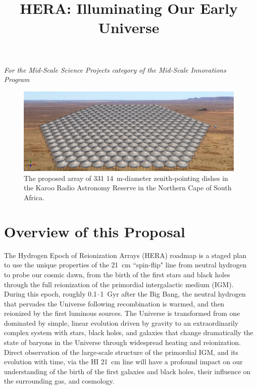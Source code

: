 \documentclass[preprint]{aastex}
\def\HI{{H{\small I }}}
\begin{document}
\title{HERA: Illuminating Our Early Universe}
{\it For the Mid-Scale Science Projects category of the Mid-Scale
Innovations Program}

\begin{figure}[H]\centering
\includegraphics[width=6in]{plots/hera331perspect2.jpg}
\caption{\small
The proposed array of 331 14~m-diameter zenith-pointing dishes in the Karoo Radio Astronomy Reserve
in the Northern Cape of South Africa.
}\label{fig:hera_array} \end{figure}


\vspace{-0.4in}
\section{Overview of this Proposal} %


The Hydrogen Epoch of Reionization Arrays (HERA) roadmap is a staged
plan to use the unique properties of the 21~cm ``spin-flip" line from neutral
hydrogen to probe our cosmic dawn, from the birth of the first 
stars and black holes through the full reionization of the primordial
intergalactic medium (IGM). During this epoch, roughly 0.1--1~Gyr after the Big Bang, 
the neutral hydrogen that pervades the Universe 
following recombination is warmed, and then reionized by the first luminous sources. 
The Universe is transformed from one dominated by simple,
linear evolution driven by gravity to an extraordinarily complex system with stars, black holes, and galaxies that
change dramatically the state of baryons in the Universe through widespread heating and reionization.
Direct observation of the large-scale structure of the primordial
IGM, and its evolution with time, via the \HI 21~cm line will
have a profound impact on our understanding of the birth of the first
galaxies and black holes, their influence on the surrounding gas,
and cosmology. 
\end{document}
